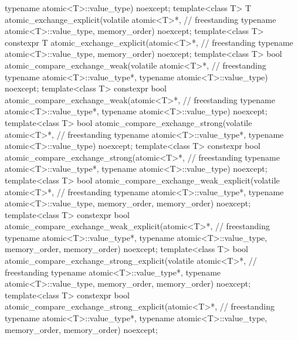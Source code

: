 \begin{codeblock}
{                                typename atomic<T>::value_type) noexcept;
  template<class T>
    T atomic_exchange_explicit(volatile atomic<T>*,                                 // freestanding
                               typename atomic<T>::value_type, memory_order) noexcept;
  template<class T>
    constexpr T atomic_exchange_explicit(atomic<T>*,                                // freestanding
                                         typename atomic<T>::value_type,
                                         memory_order) noexcept;
  template<class T>
    bool atomic_compare_exchange_weak(volatile atomic<T>*,                          // freestanding
                                      typename atomic<T>::value_type*,
                                      typename atomic<T>::value_type) noexcept;
  template<class T>
    constexpr bool atomic_compare_exchange_weak(atomic<T>*,                         // freestanding
                                                typename atomic<T>::value_type*,
                                                typename atomic<T>::value_type) noexcept;
  template<class T>
    bool atomic_compare_exchange_strong(volatile atomic<T>*,                        // freestanding
                                        typename atomic<T>::value_type*,
                                        typename atomic<T>::value_type) noexcept;
  template<class T>
    constexpr bool atomic_compare_exchange_strong(atomic<T>*,                       // freestanding
                                                  typename atomic<T>::value_type*,
                                                  typename atomic<T>::value_type) noexcept;
  template<class T>
    bool atomic_compare_exchange_weak_explicit(volatile atomic<T>*,                 // freestanding
                                               typename atomic<T>::value_type*,
                                               typename atomic<T>::value_type,
                                               memory_order, memory_order) noexcept;
  template<class T>
    constexpr bool atomic_compare_exchange_weak_explicit(atomic<T>*,                // freestanding
                                               typename atomic<T>::value_type*,
                                               typename atomic<T>::value_type,
                                               memory_order, memory_order) noexcept;
  template<class T>
    bool atomic_compare_exchange_strong_explicit(volatile atomic<T>*,               // freestanding
                                                 typename atomic<T>::value_type*,
                                                 typename atomic<T>::value_type,
                                                 memory_order, memory_order) noexcept;
  template<class T>
    constexpr bool atomic_compare_exchange_strong_explicit(atomic<T>*,              // freestanding
                                                 typename atomic<T>::value_type*,
                                                 typename atomic<T>::value_type,
                                                 memory_order, memory_order) noexcept;

}
\end{codeblock}
